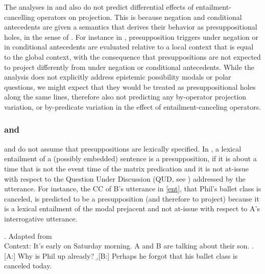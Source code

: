 \documentclass[a4paper,12pt,twoside]{article}
\begin{document}
    The analyses in \citealt{heim_projection_1983} and \citealt{van_der_sandt_presupposition_1992} also do not predict differential effects of entailment-cancelling operators on projection. This is because negation and conditional antecedents are given a semantics that derives their behavior as presuppositional holes, in the sense of \citealt{karttunen_observations_1971}. For instance in \citealt{heim_projection_1983}, presupposition triggers under negation or in conditional antecedents are evaluated relative to a local context that is equal to the global context, with the consequence that presuppositions are not expected to project differently from under negation or conditional antecedents. While the analysis does not explicitly address epistemic possibility modals or polar questions, we might expect that they would be treated as presuppositional holes along the same lines, therefore also not predicting any by-operator projection variation, or by-predicate variation in the effect of entailment-canceling operators.
		
	

\subsubsection{\citealt{abrusan_predicting_2011} and \citealt*{simons_best_2017}}\label{s:abrusan}

    \citealt{abrusan_predicting_2011} and \citealt{simons_best_2017} do not assume that presuppositions are lexically specified. In \citealt{abrusan_predicting_2011}, a lexical entailment of a (possibly embedded) sentence is a presupposition, if it is about a time that is not the event time of the matrix predication and it is not at-issue with respect to the Question Under Discussion (QUD, see \citealt{roberts_information_1996,roberts_information_2012}) addressed by the utterance. For instance, the CC of B's utterance in \ref{ent}, that Phil's ballet class is canceled, is predicted to be a presupposition (and therefore to project) because it is a lexical entailment of the modal prejacent and not at-issue with respect to A's interrogative utterance.
    
    \ex.\label{ent} Adapted from \citealt[188]{simons_best_2017} \\ Context: It's early on Saturday morning. A and B are talking about their son. 
    \a.[A:] Why is Phil up already?
    \b.[B:] Perhaps he forgot that his ballet class is canceled today. 
\end{document}
